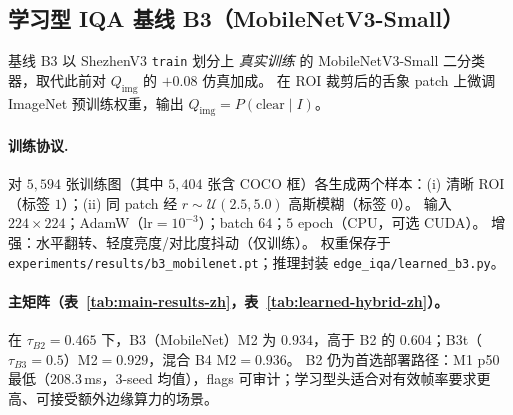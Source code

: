\subsection{学习型 IQA 基线 B3（MobileNetV3-Small）}
\label{sec:b3-learned-zh}

基线 B3 以 ShezhenV3 \texttt{train} 划分上 \emph{真实训练} 的 MobileNetV3-Small 二分类器，取代此前对 $Q_{\mathrm{img}}$ 的 $+0.08$ 仿真加成。
在 ROI 裁剪后的舌象 patch 上微调 ImageNet 预训练权重，输出 $Q_{\mathrm{img}} = P(\mathrm{clear}\mid I)$。

\paragraph{训练协议.}
对 $5{,}594$ 张训练图（其中 $5{,}404$ 张含 COCO 框）各生成两个样本：(i) 清晰 ROI（标签 $1$）；(ii) 同 patch 经 $r{\sim}\mathcal{U}(2.5,5.0)$ 高斯模糊（标签 $0$）。
输入 $224{\times}224$；AdamW（$\mathrm{lr}{=}10^{-3}$）；batch $64$；$5$ epoch（CPU，可选 CUDA）。
增强：水平翻转、轻度亮度/对比度抖动（仅训练）。
权重保存于 \texttt{experiments/results/b3\_mobilenet.pt}；推理封装 \texttt{edge\_iqa/learned\_b3.py}。

\paragraph{主矩阵（表~\ref{tab:main-results-zh}，表~\ref{tab:learned-hybrid-zh}）。}
在 $\tau_{B2}{=}0.465$ 下，B3（MobileNet）M2 为 $0.934$，高于 B2 的 $0.604$；B3t（$\tau_{B3}{=}0.5$）M2$=0.929$，混合 B4 M2$=0.936$。
B2 仍为首选部署路径：M1 p50 最低（208.3\,ms，3-seed 均值），flags 可审计；学习型头适合对有效帧率要求更高、可接受额外边缘算力的场景。
